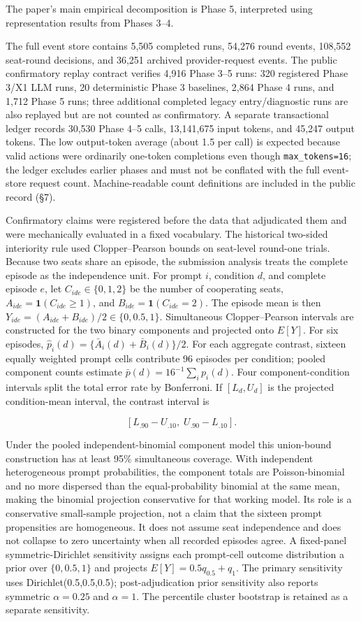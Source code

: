 \documentclass[
  11pt]{article}
\begin{document}
The paper's main empirical decomposition is Phase 5, interpreted using
representation results from Phases 3--4.

The full event store contains 5,505 completed runs, 54,276 round events,
108,552 seat-round decisions, and 36,251 archived provider-request
events. The public confirmatory replay contract verifies 4,916 Phase
3--5 runs: 320 registered Phase 3/X1 LLM runs, 20 deterministic Phase 3
baselines, 2,864 Phase 4 runs, and 1,712 Phase 5 runs; three additional
completed legacy entry/diagnostic runs are also replayed but are not
counted as confirmatory. A separate transactional ledger records 30,530
Phase 4--5 calls, 13,141,675 input tokens, and 45,247 output tokens. The
low output-token average (about 1.5 per call) is expected because valid
actions were ordinarily one-token completions even though
\texttt{max\_tokens=16}; the ledger excludes earlier phases and must not
be conflated with the full event-store request count. Machine-readable
count definitions are included in the public record (§7).

Confirmatory claims were registered before the data that adjudicated
them and were mechanically evaluated in a fixed vocabulary. The
historical two-sided interiority rule used Clopper--Pearson bounds on
seat-level round-one trials. Because two seats share an episode, the
submission analysis treats the complete episode as the independence
unit. For prompt \(i\), condition \(d\), and complete episode \(e\), let
\(C_{ide}\in\{0,1,2\}\) be the number of cooperating seats,
\(A_{ide}=\mathbf 1(C_{ide}\ge1)\), and
\(B_{ide}=\mathbf 1(C_{ide}=2)\). The episode mean is then
\(Y_{ide}=(A_{ide}+B_{ide})/2\in\{0,0.5,1\}\). Simultaneous
Clopper--Pearson intervals are constructed for the two binary components
and projected onto \(E[Y]\). For six episodes,
\(\hat p_i(d)=\{\bar A_i(d)+\bar B_i(d)\}/2\). For each aggregate
contrast, sixteen equally weighted prompt cells contribute 96 episodes
per condition; pooled component counts estimate
\(\bar p(d)=16^{-1}\sum_i p_i(d)\). Four component-condition intervals
split the total error rate by Bonferroni. If \([L_d,U_d]\) is the
projected condition-mean interval, the contrast interval is

\[
[L_{.90}-U_{.10},\;U_{.90}-L_{.10}].
\]

Under the pooled independent-binomial component model this union-bound
construction has at least 95\% simultaneous coverage. With independent
heterogeneous prompt probabilities, the component totals are
Poisson-binomial and no more dispersed than the equal-probability
binomial at the same mean, making the binomial projection conservative
for that working model. Its role is a conservative small-sample
projection, not a claim that the sixteen prompt propensities are
homogeneous. It does not assume seat independence and does not collapse
to zero uncertainty when all recorded episodes agree. A fixed-panel
symmetric-Dirichlet sensitivity assigns each prompt-cell outcome
distribution a prior over \(\{0,0.5,1\}\) and projects
\(E[Y]=0.5q_{0.5}+q_1\). The primary sensitivity uses
Dirichlet(0.5,0.5,0.5); post-adjudication prior sensitivity also reports
symmetric \(\alpha=0.25\) and \(\alpha=1\). The percentile cluster
bootstrap is retained as a separate sensitivity.
\end{document}
